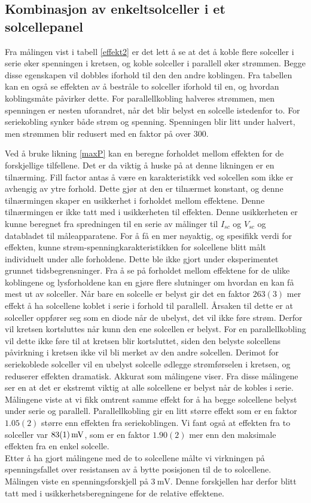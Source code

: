 \documentclass[%
 reprint,
 amsmath,amssymb,
 aps,
 norsk,
 booktabs
]{revtex4-1}
\begin{document}
\subsection{Kombinasjon av enkeltsolceller i et solcellepanel}
Fra målingen vist i tabell \vref{effekt2} er det lett å se at det å koble flere solceller i serie øker spenningen i kretsen, og koble solceller i parallell øker strømmen. Begge disse egenskapen vil dobbles iforhold til den den andre koblingen. Fra tabellen kan en også se effekten av å bestråle to solceller iforhold til en, og hvordan koblingsmåte påvirker dette. For parallellkobling halveres strømmen, men spenningen er nesten uforandret, når det blir belyst en solcelle istedenfor to. For seriekobling synker både strøm og spenning. Spenningen blir litt under halvert, men strømmen blir redusert med en faktor på over $300$. \par
Ved å bruke likning \eqref{maxP} kan en beregne forholdet mellom effekten for de forskjellige tilfellene. Det er da viktig å huske på at denne likningen er en tilnærming. Fill factor antas å være en karakteristikk ved solcellen som ikke er avhengig av ytre forhold. Dette gjør at den er tilnærmet konstant, og denne tilnærmingen skaper en usikkerhet i forholdet mellom effektene. Denne tilnærmingen er ikke tatt med i usikkerheten til effekten. Denne usikkerheten er kunne beregnet fra spredningen til en serie av målinger til $I_{sc}$ og $V_{sc}$ og databladet til måleapparatene. For å få en mer nøyaktig, og spesifikk verdi for effekten, kunne strøm-spenningkarakteristikken for solcellene blitt målt individuelt under alle forholdene. Dette ble ikke gjort under eksperimentet grunnet tidsbegrensninger. Fra å se på forholdet mellom effektene for de ulike koblingene og lysforholdene kan en gjøre flere slutninger om hvordan en kan få mest ut av solceller. Når bare en solcelle er belyst gir det en faktor $263(3)$ mer effekt å ha solcellene koblet i serie i forhold til parallell. Årsaken til dette er at solceller oppfører seg som en diode når de ubelyst, det vil ikke føre strøm. Derfor vil kretsen kortsluttes når kunn den ene solcellen er belyst. For en parallellkobling vil dette ikke føre til at kretsen blir kortsluttet, siden den belyste solcellens påvirkning i kretsen ikke vil bli merket av den andre solcellen. Derimot for seriekoblede solceller vil en ubelyst solcelle ødlegge strømførselen i kretsen, og reduserer effekten dramatisk. Akkurat som målingene viser. Fra disse målingene ser en at det er ekstremt viktig at alle solcellene er belyst når de kobles i serie. Målingene viste at vi fikk omtrent samme effekt for å ha begge solcellene belyst under serie og parallell. Parallellkobling gir en litt større effekt som er en faktor $1.05(2)$ større enn effekten fra seriekoblingen. Vi fant også at effekten fra to solceller var $\SI{83\pm1}{\milli\volt}$, som er en faktor $1.90(2)$ mer enn den maksimale effekten fra en enkel solcelle.
\\
Etter å ha gjort målingene med de to solcellene målte vi virkningen på spenningsfallet over resistansen av å bytte posisjonen til de to solcellene. Målingen viste en spenningsforskjell på $\SI{3}{\milli\volt}$. Denne forskjellen har derfor blitt tatt med i usikkerhetsberegningene for de relative effektene.
\end{document}

